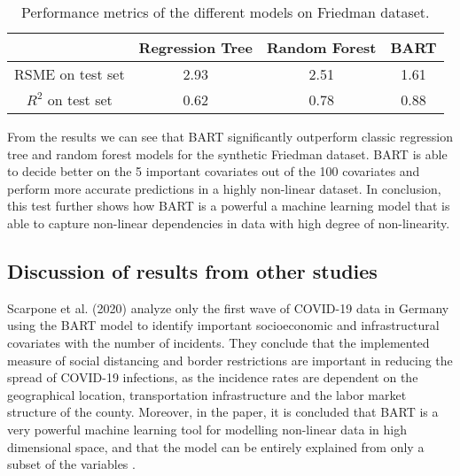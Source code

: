 \documentclass{usiinftr}
\begin{document}
\begin{table} 
\centering \caption{Performance metrics of the different models on Friedman dataset.}
\begin{tabular}{|c|c|c|c|} 
\hline & Regression Tree & Random Forest & BART \\
\hline RSME on test set & 2.93 & 2.51 & 1.61 \\
\hline $R^2$ on test set & 0.62 & 0.78 & 0.88 \\
\hline
\end{tabular}
\label{result_table}
\end{table}

From the results we can see that BART significantly outperform classic regression tree and random forest models for the synthetic Friedman dataset. BART is able to decide better on the 5 important covariates out of the 100 covariates and perform more accurate predictions in a highly non-linear dataset. In conclusion, this test further shows how BART is a powerful a machine learning model that is able to capture non-linear dependencies in data with high degree of non-linearity. 

\subsection{Discussion of results from other studies}
Scarpone et al. (2020) \cite{16} analyze only the first wave of COVID-19 data in Germany using the BART model to identify important socioeconomic and infrastructural covariates with the number of incidents. They conclude that the implemented measure of social distancing and border restrictions are important in reducing the spread of COVID-19 infections, as the incidence rates are dependent on the geographical location, transportation infrastructure and the labor market structure of the county. Moreover, in the paper, it is concluded that BART is a very powerful machine learning tool for modelling non-linear data in high dimensional space, and that the model can be entirely explained from only a subset of the variables \cite{16}.  
\end{document}
